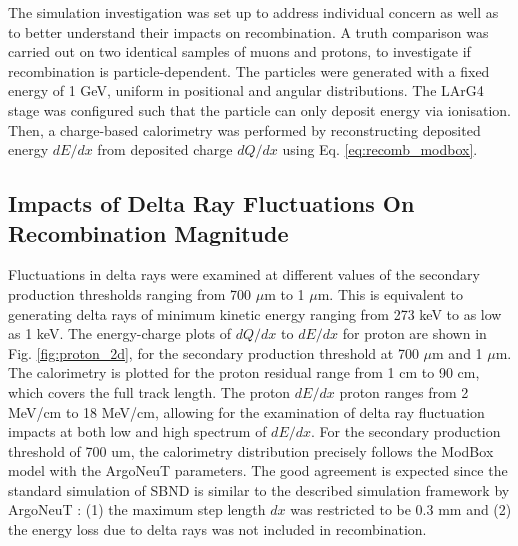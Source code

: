 The simulation investigation was set up to address individual concern as well as to better understand their impacts on recombination.
A truth comparison was carried out on two identical samples of muons and protons, to investigate if recombination is particle-dependent. 
The particles were generated with a fixed energy of 1 GeV, uniform in positional and angular distributions.
The LArG4 stage was configured such that the particle can only deposit energy via ionisation.
Then, a charge-based calorimetry was performed by reconstructing deposited energy $dE/dx$ from deposited charge $dQ/dx$ using Eq. \ref{eq:recomb_modbox}.

\subsection{Impacts of Delta Ray Fluctuations On Recombination Magnitude}
\label{sec:impactDeltaRayMag}

Fluctuations in delta rays were examined at different values of the secondary production thresholds ranging from 700 $\mu$m to 1 $\mu$m.
This is equivalent to generating delta rays of minimum kinetic energy ranging from 273 keV to as low as 1 keV.
The energy-charge plots of $dQ/dx$ to $dE/dx$ for proton are shown in Fig. \ref{fig:proton_2d}, for the secondary production threshold at 700 $\mu$m and 1 $\mu$m.
The calorimetry is plotted for the proton residual range from 1 cm to 90 cm, which covers the full track length. 
The proton $dE/dx$ proton ranges from 2 MeV/cm to 18 MeV/cm, allowing for the examination of delta ray fluctuation impacts at both low and high spectrum of $dE/dx$. 
For the secondary production threshold of 700 um, the calorimetry distribution precisely follows the ModBox model with the ArgoNeuT parameters.
The good agreement is expected since the standard simulation of SBND is similar to the described simulation framework by ArgoNeuT \cite{argoneut_recomb}: (1) the maximum step length $dx$ was restricted to be 0.3 mm and (2) the energy loss due to delta rays was not included in recombination.
 
